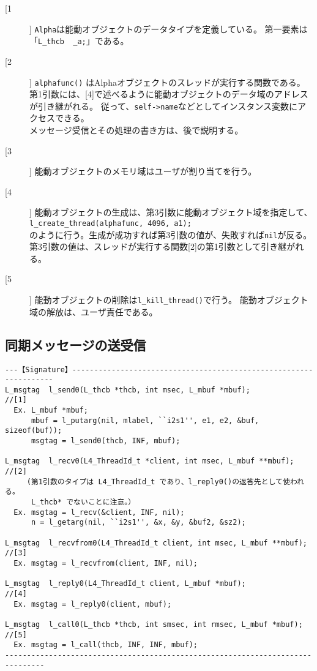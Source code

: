 \documentclass{jarticle}
\begin{document}
\begin{description}
\item[[1]]
  \verb|Alpha|は能動オブジェクトのデータタイプを定義している。
  第一要素は「\verb|L_thcb  _a;|」である。　

\item[[2]]
  \verb|alphafunc()| はAlphaオブジェクトのスレッドが実行する関数である。
  第1引数には、[4]で述べるように能動オブジェクトのデータ域のアドレスが引き継がれる。
  従って、\verb|self->name|などとしてインスタンス変数にアクセスできる。\\
  メッセージ受信とその処理の書き方は、後で説明する。

\item[[3]]  能動オブジェクトのメモリ域はユーザが割り当てを行う。

\item[[4]]  能動オブジェクトの生成は、第3引数に能動オブジェクト域を指定して、\\
  \verb|l_create_thread(alphafunc, 4096, a1);| \\
  のように行う。生成が成功すれば第3引数の値が、失敗すれば\verb|nil|が反る。
  第3引数の値は、スレッドが実行する関数[2]の第1引数として引き継がれる。

\item[[5]]  能動オブジェクトの削除は\verb|l_kill_thread()|で行う。
  能動オブジェクト域の解放は、ユーザ責任である。

\end{description}



\subsection{同期メッセージの送受信}

\begin{verbatim}
---【Signature】------------------------------------------------------------------
L_msgtag  l_send0(L_thcb *thcb, int msec, L_mbuf *mbuf);           //[1]
  Ex. L_mbuf *mbuf;
      mbuf = l_putarg(nil, mlabel, ``i2s1'', e1, e2, &buf, sizeof(buf));
      msgtag = l_send0(thcb, INF, mbuf);

L_msgtag  l_recv0(L4_ThreadId_t *client, int msec, L_mbuf **mbuf);  //[2]
     (第1引数のタイプは L4_ThreadId_t であり、l_reply0()の返答先として使われる。
      L_thcb* でないことに注意。）
  Ex. msgtag = l_recv(&client, INF, nil);
      n = l_getarg(nil, ``i2s1'', &x, &y, &buf2, &sz2);

L_msgtag  l_recvfrom0(L4_ThreadId_t client, int msec, L_mbuf **mbuf); //[3]
  Ex. msgtag = l_recvfrom(client, INF, nil);

L_msgtag  l_reply0(L4_ThreadId_t client, L_mbuf *mbuf);              //[4]
  Ex. msgtag = l_reply0(client, mbuf);

L_msgtag  l_call0(L_thcb *thcb, int smsec, int rmsec, L_mbuf *mbuf); //[5]
  Ex. msgtag = l_call(thcb, INF, INF, mbuf);
-------------------------------------------------------------------------------
\end{verbatim}
\end{document}
